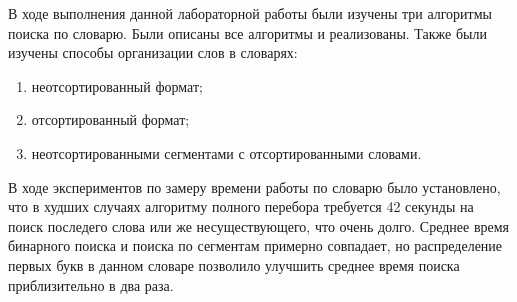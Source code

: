 \Conclusion
    В ходе выполнения данной лабораторной работы были изучены три алгоритмы поиска по словарю.
    Были описаны все алгоритмы и реализованы. 
    Также были изучены способы организации слов в словарях:
    \begin{enumerate}
        \item неотсортированный формат;
        \item отсортированный формат;
        \item неотсортированными сегментами с отсортированными словами.
    \end{enumerate}
    
    В ходе экспериментов по замеру времени работы по словарю
    было установлено, что 
    в худших случаях алгоритму полного перебора требуется 42 секунды 
    на поиск последего слова или же несуществующего, что очень долго.
    Среднее время бинарного поиска и поиска по сегментам примерно совпадает,
    но распределение первых букв в данном словаре позволило 
    улучшить среднее время поиска приблизительно в два раза.

